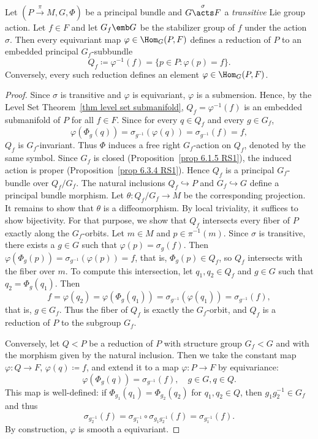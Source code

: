 \begin{prop}[{{\cite[Prop.~1.6.2]{RS2}}}]\label{prop 1.6.2 RS2}
    Let $(P\overset{\pi}{\to}M,G,\Phi)$ be a principal bundle and $G\overset{\sigma}{\acts}F$ a \emph{transitive} Lie group action. Let $f\in F$ and let $G_f\emb G$ be the stabilizer group of $f$ under the action $\sigma$. Then every equivariant map $\varphi\in\Hom_G(P,F)$ defines a reduction of $P$ to an embedded principal $G_f$-subbundle
    \[Q_f\coloneqq \varphi^{-1}(f)=\{p\in P:\varphi(p)=f\}.\]
    Conversely, every such reduction defines an element $\varphi\in \Hom_G(P,F)$.
\end{prop}
\begin{proof}
    Since $\sigma$ is transitive and $\varphi$ is equivariant, $\varphi$ is a submersion. Hence, by the Level Set Theorem~\ref{thm level set submanifold}, $Q_f=\varphi^{-1}(f)$ is an embedded submanifold of $P$ for all $f\in F$. Since for every $q\in Q_f$ and every $g\in G_f$,
    \[\varphi(\Phi_g(q))=\sigma_{g^{-1}}(\varphi(q))=\sigma_{g^{-1}}(f)=f,\]
    $Q_f$ is $G_f$-invariant. Thus $\Phi$ induces a free right $G_f$-action on $Q_f$, denoted by the same symbol. Since $G_f$ is closed (Proposition~\ref{prop 6.1.5 RS1}), the induced action is proper (Proposition~\ref{prop 6.3.4 RS1}). Hence $Q_f$ is a principal $G_f$-bundle over $Q_f\slash G_f$. The natural inclusions $Q_f\hookrightarrow P$ and $G_f\hookrightarrow G$ define a principal bundle morphism. Let $\theta:Q_f\slash G_f\to M$ be the corresponding projection. It remains to show that $\theta$ is a diffeomorphism. By local triviality, it suffices to show bijectivity. For that purpose, we show that $Q_f$ intersects every fiber of $P$ exactly along the $G_f$-orbits. Let $m\in M$ and $p\in\pi^{-1}(m)$. Since $\sigma$ is transitive, there exists a $g\in G$ such that $\varphi(p)=\sigma_g(f)$. Then $\varphi(\Phi_g(p))=\sigma_{g^{-1}}(\varphi(p))=f$, that is, $\Phi_g(p)\in Q_f$, so $Q_f$ intersects with the fiber over $m$. To compute this intersection, let $q_1,q_2\in Q_f$ and $g\in G$ such that $q_2=\Phi_g(q_1)$. Then
    \[f=\varphi(q_2)=\varphi(\Phi_g(q_1))=\sigma_{g^{-1}}(\varphi(q_1))=\sigma_{g^{-1}}(f),\]
    that is, $g\in G_f$. Thus the fiber of $Q_f$ is exactly the $G_f$-orbit, and $Q_f$ is a reduction of $P$ to the subgroup $G_f$.

    Conversely, let $Q<P$ be a reduction of $P$ with structure group $G_f<G$ and with the morphism given by the natural inclusion. Then we take the constant map $\varphi:Q\to F$, $\varphi(q)\coloneqq f$, and extend it to a map $\varphi:P\to F$ by equivariance:
    \[\varphi(\Phi_g(q))=\sigma_{g^{-1}}(f),\quad g\in G,q\in Q.\]
    This map is well-defined: if $\Phi_{g_1}(q_1)=\Phi_{g_2}(q_2)$ for $q_1,q_2\in Q$, then $g_1g_2^{-1}\in G_f$ and thus
    \[\sigma_{g_2^{-1}}(f)=\sigma_{g_1^{-1}}\circ\sigma_{g_1g_2^{-1}}(f)=\sigma_{g_1^{-1}}(f).\]
    By construction, $\varphi$ is smooth a equivariant.
\end{proof}

